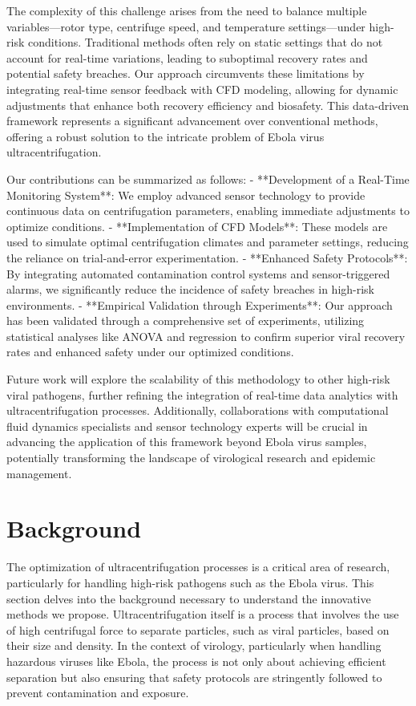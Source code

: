 \documentclass{article}
\begin{document}
The complexity of this challenge arises from the need to balance multiple variables—rotor type, centrifuge speed, and temperature settings—under high-risk conditions. Traditional methods often rely on static settings that do not account for real-time variations, leading to suboptimal recovery rates and potential safety breaches. Our approach circumvents these limitations by integrating real-time sensor feedback with CFD modeling, allowing for dynamic adjustments that enhance both recovery efficiency and biosafety. This data-driven framework represents a significant advancement over conventional methods, offering a robust solution to the intricate problem of Ebola virus ultracentrifugation.

Our contributions can be summarized as follows:
- **Development of a Real-Time Monitoring System**: We employ advanced sensor technology to provide continuous data on centrifugation parameters, enabling immediate adjustments to optimize conditions.
- **Implementation of CFD Models**: These models are used to simulate optimal centrifugation climates and parameter settings, reducing the reliance on trial-and-error experimentation.
- **Enhanced Safety Protocols**: By integrating automated contamination control systems and sensor-triggered alarms, we significantly reduce the incidence of safety breaches in high-risk environments.
- **Empirical Validation through Experiments**: Our approach has been validated through a comprehensive set of experiments, utilizing statistical analyses like ANOVA and regression to confirm superior viral recovery rates and enhanced safety under our optimized conditions.

Future work will explore the scalability of this methodology to other high-risk viral pathogens, further refining the integration of real-time data analytics with ultracentrifugation processes. Additionally, collaborations with computational fluid dynamics specialists and sensor technology experts will be crucial in advancing the application of this framework beyond Ebola virus samples, potentially transforming the landscape of virological research and epidemic management.

\section{Background}
The optimization of ultracentrifugation processes is a critical area of research, particularly for handling high-risk pathogens such as the Ebola virus. This section delves into the background necessary to understand the innovative methods we propose. Ultracentrifugation itself is a process that involves the use of high centrifugal force to separate particles, such as viral particles, based on their size and density. In the context of virology, particularly when handling hazardous viruses like Ebola, the process is not only about achieving efficient separation but also ensuring that safety protocols are stringently followed to prevent contamination and exposure.
\end{document}
